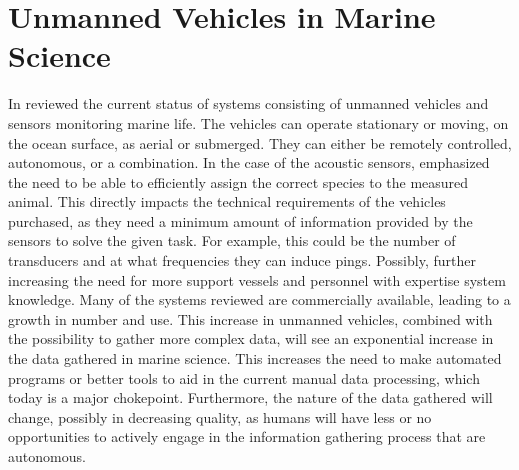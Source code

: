 


\section{Unmanned Vehicles in Marine Science} \label{Unmanned Vehicles in Marine Science}
        In \citeyear{VERFUSS201917} \citeauthor{VERFUSS201917}\cite{VERFUSS201917} reviewed the current status of systems consisting of unmanned vehicles and  sensors monitoring marine life. The vehicles can operate stationary or moving, on the ocean surface, as aerial or submerged.  They can either be remotely controlled, autonomous, or a combination. In the case of the acoustic sensors, \citeauthor{VERFUSS201917} emphasized the need to be able to efficiently assign the correct species to the measured animal. This directly impacts the technical requirements of the vehicles purchased, as they need a minimum amount of information provided by the sensors to solve the given task. For example, this could be the number of transducers and at what frequencies they can induce pings. Possibly, further increasing the need for more support vessels and personnel with expertise system knowledge. Many of the systems reviewed are commercially available, leading to a growth in number and use.  This increase in unmanned vehicles, combined with the possibility to gather more complex data, will see an exponential increase in the data gathered in marine science\cite{malde2020machine}. This increases the need to make automated programs or better tools to aid in the current manual data processing, which today is a major chokepoint. Furthermore,  the nature of the data gathered will change, possibly in decreasing quality, as humans will have less or no opportunities to actively engage in the information gathering process that are autonomous.
        
